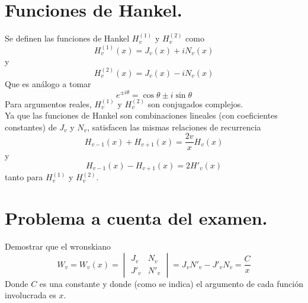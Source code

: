 \section{Funciones de Hankel.}
Se definen las funciones de Hankel $H_{v}^{(1)}$ y $H_{v}^{(2)}$ como
\begin{equation}
H_{v}^{(1)}(x) = J_{v}(x) + i N_{v}(x)
\label{eq:ecuacion_11_85}
\end{equation}
y
\begin{equation}
H_{v}^{(2)}(x) = J_{v}(x) - i N_{v}(x)
\label{eq:ecuacion_11_86}
\end{equation}
Que es análogo a tomar
\begin{equation}
e^{\pm i \theta} =  \cos \theta \pm i \sin \theta
\label{eq:ecuacion_11_87}
\end{equation}
Para argumentos reales, $H_{v}^{(1)}$ y $H_{v}^{(2)}$  son conjugados complejos.
\\
Ya que las funciones de Hankel son combinaciones lineales (con coeficientes constantes) de $J_{v}$ y $N_{v}$, satisfacen las mismas relaciones de recurrencia
\begin{equation}
H_{v-1} (x) + H_{v+1} (x) = \dfrac{2v}{x} H_{v} (x)
\label{eq:ecuacion_11_92}
\end{equation} 
y 
\begin{equation}
H_{v-1} (x) - H_{v+1} (x) = 2 H'_{v} (x)
\label{eq:ecuacion_11_92}
\end{equation} 
tanto para $H_{v}^{(1)}$ y $H_{v}^{(2)}$.
\section{Problema a cuenta del examen.}
Demostrar que el wronskiano
\begin{equation}
W_{v} = W_{v}(x) = \begin{vmatrix}
J_{v} & N_{v} \\
J'_{v} & N'_{v}
\end{vmatrix} = J_{v} N'_{v} - J'_{v} N_{v} = \dfrac{C}{x}
\end{equation}
Donde $C$ es una constante y donde (como se indica) el argumento de cada función involucrada es $x$.

